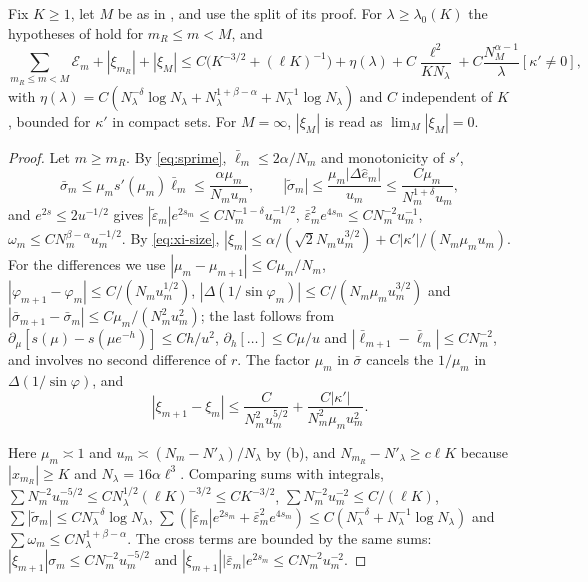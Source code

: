 \begin{lemma}\label{lem:nearsums}
Fix $K\ge1$, let $M$ be as in , and use the split of its proof. For
$\lambda\ge\lambda_0(K)$ the hypotheses of  hold for $m_R\le m<M$, and
\[
  \sum_{m_R\le m<M}\mathcal E_m+|\xi_{m_R}|+|\xi_M|
  \le C\bigl(K^{-3/2}+(\ell K)^{-1}\bigr)+\eta(\lambda)+C\frac{\ell^2}{KN_\lambda}+C\frac{N_M^{\alpha-1}}{\lambda}[\kappa'\ne0],
\]
with $\eta(\lambda)=C(N_\lambda^{-\delta}\log N_\lambda+N_\lambda^{1+\beta-\alpha}+N_\lambda^{-1}\log N_\lambda)$ and
$C$ independent of $K$, bounded for $\kappa'$ in compact sets. For $M=\infty$, $|\xi_M|$ is
read as $\lim_M|\xi_M|=0$.
\end{lemma}

\begin{proof}
 Let $m\ge m_R$. By \eqref{eq:sprime}, $\bar\ell_m\le2\alpha/N_m$ and
monotonicity of $s'$,
\[
  \bar\sigma_m\le\mu_ms'(\mu_m)\bar\ell_m\le\frac{\alpha\mu_m}{N_mu_m},\qquad
  |\tilde\sigma_m|\le\frac{\mu_m|\Delta\hat e_m|}{u_m}\le\frac{C\mu_m}{N_m^{1+\delta}u_m},
\]
and $e^{2s}\le2u^{-1/2}$ gives $|\tilde\varepsilon_m|e^{2s_m}\le CN_m^{-1-\delta}u_m^{-1/2}$,
$\bar\varepsilon_m^2e^{4s_m}\le CN_m^{-2}u_m^{-1}$, $\omega_m\le CN_m^{\beta-\alpha}u_m^{-1/2}$. By
\eqref{eq:xi-size},
$|\xi_m|\le\alpha/(\sqrt2N_mu_m^{3/2})+C|\kappa'|/(N_m\mu_mu_m)$. For the differences we
use $|\mu_m-\mu_{m+1}|\le C\mu_m/N_m$, $|\varphi_{m+1}-\varphi_m|\le C/(N_mu_m^{1/2})$,
$|\Delta(1/\sin\varphi_m)|\le C/(N_m\mu_mu_m^{3/2})$ and
$|\bar\sigma_{m+1}-\bar\sigma_m|\le C\mu_m/(N_m^2u_m^2)$; the last follows from
$\partial_\mu[s(\mu)-s(\mu e^{-h})]\le Ch/u^2$, $\partial_h[\dots]\le C\mu/u$ and
$|\bar\ell_{m+1}-\bar\ell_m|\le CN_m^{-2}$, and involves no second difference of $r$. The
factor $\mu_m$ in $\bar\sigma$ cancels the $1/\mu_m$ in $\Delta(1/\sin\varphi)$, and
\[
  |\xi_{m+1}-\xi_m|\le\frac{C}{N_m^2u_m^{5/2}}+\frac{C|\kappa'|}{N_m^2\mu_mu_m^2}.
\]

 Here $\mu_m\asymp1$ and $u_m\asymp(N_m-N'_\lambda)/N_\lambda$
by (b), and $N_{m_R}-N'_\lambda\ge c\ell K$ because $|x_{m_R}|\ge K$ and
$N_\lambda=16\alpha\ell^3$. Comparing sums with integrals,
$\sum N_m^{-2}u_m^{-5/2}\le CN_\lambda^{1/2}(\ell K)^{-3/2}\le CK^{-3/2}$,
$\sum N_m^{-2}u_m^{-2}\le C/(\ell K)$,
$\sum|\tilde\sigma_m|\le CN_\lambda^{-\delta}\log N_\lambda$,
$\sum(|\tilde\varepsilon_m|e^{2s_m}+\bar\varepsilon_m^2e^{4s_m})\le C(N_\lambda^{-\delta}+N_\lambda^{-1}\log N_\lambda)$ and
$\sum\omega_m\le CN_\lambda^{1+\beta-\alpha}$. The cross terms are bounded by the same
sums: $|\xi_{m+1}|\sigma_m\le CN_m^{-2}u_m^{-5/2}$ and
$|\xi_{m+1}||\bar\varepsilon_m|e^{2s_m}\le CN_m^{-2}u_m^{-2}$.


\end{proof}
